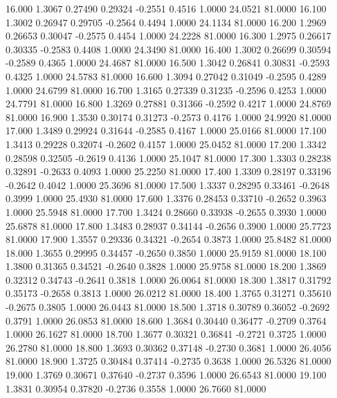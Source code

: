   16.000   1.3067   0.27490   0.29324  -0.2551   0.4516   1.0000  24.0521  81.0000
  16.100   1.3002   0.26947   0.29705  -0.2564   0.4494   1.0000  24.1134  81.0000
  16.200   1.2969   0.26653   0.30047  -0.2575   0.4454   1.0000  24.2228  81.0000
  16.300   1.2975   0.26617   0.30335  -0.2583   0.4408   1.0000  24.3490  81.0000
  16.400   1.3002   0.26699   0.30594  -0.2589   0.4365   1.0000  24.4687  81.0000
  16.500   1.3042   0.26841   0.30831  -0.2593   0.4325   1.0000  24.5783  81.0000
  16.600   1.3094   0.27042   0.31049  -0.2595   0.4289   1.0000  24.6799  81.0000
  16.700   1.3165   0.27339   0.31235  -0.2596   0.4253   1.0000  24.7791  81.0000
  16.800   1.3269   0.27881   0.31366  -0.2592   0.4217   1.0000  24.8769  81.0000
  16.900   1.3530   0.30174   0.31273  -0.2573   0.4176   1.0000  24.9920  81.0000
  17.000   1.3489   0.29924   0.31644  -0.2585   0.4167   1.0000  25.0166  81.0000
  17.100   1.3413   0.29228   0.32074  -0.2602   0.4157   1.0000  25.0452  81.0000
  17.200   1.3342   0.28598   0.32505  -0.2619   0.4136   1.0000  25.1047  81.0000
  17.300   1.3303   0.28238   0.32891  -0.2633   0.4093   1.0000  25.2250  81.0000
  17.400   1.3309   0.28197   0.33196  -0.2642   0.4042   1.0000  25.3696  81.0000
  17.500   1.3337   0.28295   0.33461  -0.2648   0.3999   1.0000  25.4930  81.0000
  17.600   1.3376   0.28453   0.33710  -0.2652   0.3963   1.0000  25.5948  81.0000
  17.700   1.3424   0.28660   0.33938  -0.2655   0.3930   1.0000  25.6878  81.0000
  17.800   1.3483   0.28937   0.34144  -0.2656   0.3900   1.0000  25.7723  81.0000
  17.900   1.3557   0.29336   0.34321  -0.2654   0.3873   1.0000  25.8482  81.0000
  18.000   1.3655   0.29995   0.34457  -0.2650   0.3850   1.0000  25.9159  81.0000
  18.100   1.3800   0.31365   0.34521  -0.2640   0.3828   1.0000  25.9758  81.0000
  18.200   1.3869   0.32312   0.34743  -0.2641   0.3818   1.0000  26.0064  81.0000
  18.300   1.3817   0.31792   0.35173  -0.2658   0.3813   1.0000  26.0212  81.0000
  18.400   1.3765   0.31271   0.35610  -0.2675   0.3805   1.0000  26.0443  81.0000
  18.500   1.3718   0.30789   0.36052  -0.2692   0.3791   1.0000  26.0853  81.0000
  18.600   1.3684   0.30440   0.36477  -0.2709   0.3764   1.0000  26.1627  81.0000
  18.700   1.3677   0.30321   0.36841  -0.2721   0.3725   1.0000  26.2780  81.0000
  18.800   1.3693   0.30362   0.37148  -0.2730   0.3681   1.0000  26.4056  81.0000
  18.900   1.3725   0.30484   0.37414  -0.2735   0.3638   1.0000  26.5326  81.0000
  19.000   1.3769   0.30671   0.37640  -0.2737   0.3596   1.0000  26.6543  81.0000
  19.100   1.3831   0.30954   0.37820  -0.2736   0.3558   1.0000  26.7660  81.0000
